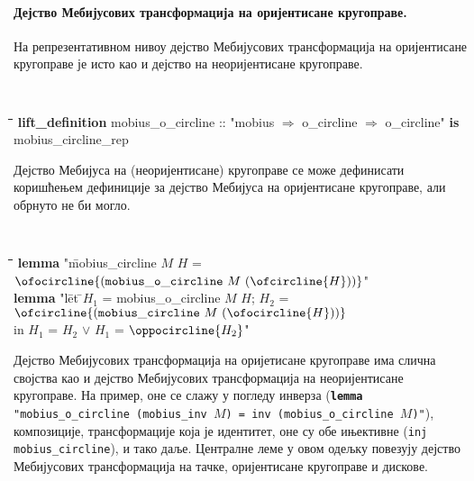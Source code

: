 \paragraph{Дејство Мебијусових трансформација на оријентисане кругоправе.} 
На репрезентативном нивоу дејство Мебијусових трансформација на
оријентисане кругоправе је исто као и дејство на неоријентисане
кругоправе.  {\tt
  \begin{tabbing}
    \hspace{5mm}\=\hspace{5mm}\=\hspace{5mm}\=\hspace{5mm}\=\hspace{5mm}\=\kill
{\bf lift\_definition} mobius\_o\_circline :: "mobius $\Rightarrow$ o\_circline $\Rightarrow$ o\_circline" {\bf is} \\
\>mobius\_circline\_rep
  \end{tabbing}
}

\noindent Дејство Мебијуса на (неоријентисане) кругоправе се може
дефинисати коришћењем дефиниције за дејство Мебијуса на оријентисане
кругоправе, али обрнуто не би могло.  {\tt
  \begin{tabbing}
    \hspace{5mm}\=\hspace{5mm}\=\hspace{5mm}\=\hspace{5mm}\=\hspace{5mm}\=\kill
{\bf lemma} "\=mobius\_circline $M$ $H$ = $\ofocircline{(\mathtt{mobius\_o\_circline}\ M\ (\ofcircline{H}))}$"\\
{\bf lemma} "l\=et \=$H_1$ = mobius\_o\_circline $M$ $H$; $H_2$ = $\ofcircline{(\mathtt{mobius\_circline}\ M\ (\ofocircline{H}))}$ \\
\>in  $H_1$ = $H_2$ $\vee$ $H_1$ = $\oppocircline{H_2}$"
  \end{tabbing}
}

\noindent Дејство Мебијусових трансформација на оријетисане кругоправе
има слична својства као и дејство Мебијусових трансформација на
неоријентисане кругоправе. На пример, оне се слажу у погледу инверза
({\tt {\bf lemma} "mobius\_o\_circline (mobius\_inv $M$) = inv
  (mobius\_o\_circline $M$)"}), композиције, трансформације која је
идентитет, оне су обе ињективне ({\tt inj mobius\_circline}), и тако
даље. Централне леме у овом одељку повезују дејство Мебијусових
трансформација на тачке, оријентисане кругоправе и дискове.

